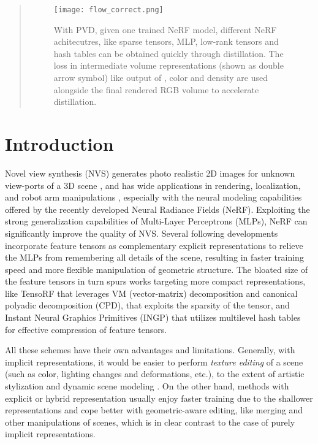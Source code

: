 \documentclass[letterpaper]{article} \usepackage{aaai23}  \usepackage{times}  \usepackage{helvet}  \usepackage{courier}  \usepackage[hyphens]{url}  \usepackage{graphicx} \urlstyle{rm} \def\UrlFont{\rm}  \usepackage{natbib}  \usepackage{caption} \frenchspacing  \setlength{\pdfpagewidth}{8.5in}  \setlength{\pdfpageheight}{11in}  \usepackage{multirow}
\begin{document}
\begin{abstract}
\begin{figure*}[t]
\centering
\texttt{[image: flow\_correct.png]} \caption{ With PVD, given one trained NeRF model, different NeRF achitecutres, like sparse tensors, MLP, low-rank tensors and hash tables can be obtained quickly through distillation. The loss in intermediate volume representations (shown as double arrow symbol) like output of , color and density are used alongside the final rendered RGB volume to accelerate distillation.}
\label{fig-flow}
\end{figure*}









\end{abstract}

\section{Introduction}
Novel view synthesis (NVS) generates photo realistic 2D images for unknown view-ports of a 3D scene \cite{zhou2018stereo,chan2021pi,sitzmann2019scene}, and has wide applications in rendering, localization, and robot arm manipulations \cite{adamkiewicz2022vision,moreau2022lens,peng2021megloc}, especially with the neural modeling capabilities offered by the recently developed Neural Radiance Fields (NeRF).
Exploiting the strong generalization capabilities of Multi-Layer Perceptrons (MLPs), NeRF can significantly improve the quality of NVS.
Several following developments incorporate feature tensors as complementary explicit representations to relieve the MLPs from remembering all details of the scene, resulting in faster training speed and more flexible manipulation of geometric structure. The bloated size of the feature tensors in turn spurs works targeting more compact representations, like TensoRF \cite{chen2022tensorf} that leverages VM (vector-matrix) decomposition and canonical polyadic decomposition (CPD), \citeauthor{fridovich2022plenoxels} that exploits the sparsity of the tensor, and Instant Neural Graphics Primitives (INGP) \cite{muller2022instant} that utilizes multilevel hash tables for effective compression of feature tensors.


All these schemes have their own advantages and limitations. 
Generally, with implicit representations, it would be easier to perform \textit{texture editing} of a scene (such as color, lighting changes and deformations, etc.), to the extent of artistic stylization and dynamic scene modeling \cite{tang2022CCNeRF, kobayashi2022decomposingEditing,pumarola2021dNeRF,gu2021styleNeRF,zhan2021multimodal}. 
On the other hand, methods with explicit or hybrid representation usually enjoy faster training due to the shallower representations and cope better with geometric-aware editing, like merging and other manipulations of scenes, which is in clear contrast to the case of purely implicit representations.
\end{document}
